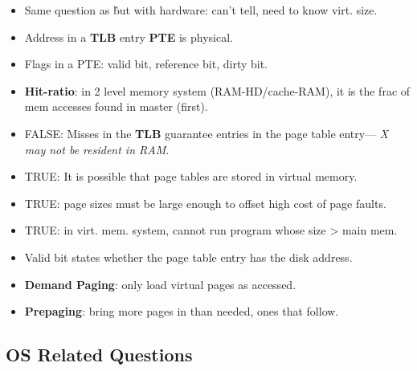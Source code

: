 \documentclass[fontsize=4.5pt]{scrartcl}
\begin{document}
\begin{multicols}{3}
\begin{itemize}
        \item Same question as \^ but with hardware: can't tell, need to know virt. size.
        \item Address in a \textbf{TLB} entry \textbf{PTE} is physical.
        \item Flags in a PTE: valid bit, reference bit, dirty bit.
        \item \textbf{Hit-ratio}: in 2 level memory system (RAM-HD/cache-RAM), it is the frac of mem accesses found in master (first).
        \item FALSE: Misses in the \textbf{TLB} guarantee entries in the page table entry--- \textit{X may not be resident in RAM}.
        \item TRUE: It is possible that page tables are stored in virtual memory.
        \item TRUE: page sizes must be large enough to offset high cost of page faults.
        \item TRUE: in virt. mem. system, cannot run program whose size > main mem.
        \item Valid bit states whether the page table entry has the disk address.
        \item \textbf{Demand Paging}: only load virtual pages as accessed.
        \item \textbf{Prepaging}: bring more pages in than needed, ones that follow.
      \end{itemize}

    \subsection{OS Related Questions}


  \end{multicols}
\end{document}
